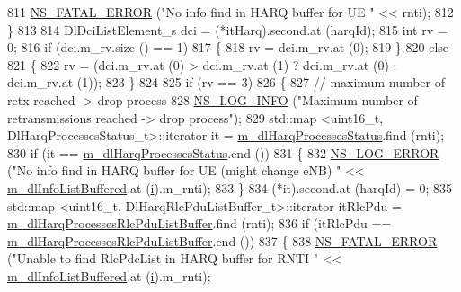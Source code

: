 \begin{DoxyCode}
811               \hyperlink{group__fatal_ga5131d5e3f75d7d4cbfd706ac456fdc85}{NS\_FATAL\_ERROR} (\textcolor{stringliteral}{"No info find in HARQ buffer for UE "} << rnti);
812             \}
813 
814           DlDciListElement\_s dci = (*itHarq).second.at (harqId);
815           \textcolor{keywordtype}{int} rv = 0;
816           \textcolor{keywordflow}{if} (dci.m\_rv.size () == 1)
817             \{
818               rv = dci.m\_rv.at (0);
819             \}
820           \textcolor{keywordflow}{else}
821             \{
822               rv = (dci.m\_rv.at (0) > dci.m\_rv.at (1) ? dci.m\_rv.at (0) : dci.m\_rv.at (1));
823             \}
824 
825           \textcolor{keywordflow}{if} (rv == 3)
826             \{
827               \textcolor{comment}{// maximum number of retx reached -> drop process}
828               \hyperlink{group__logging_gafbd73ee2cf9f26b319f49086d8e860fb}{NS\_LOG\_INFO} (\textcolor{stringliteral}{"Maximum number of retransmissions reached -> drop process"});
829               std::map <uint16\_t, DlHarqProcessesStatus\_t>::iterator it = 
      \hyperlink{classns3_1_1TdBetFfMacScheduler_af9f2ffd80c6d473a5ccee8fb153d40f6}{m\_dlHarqProcessesStatus}.find (rnti);
830               \textcolor{keywordflow}{if} (it == \hyperlink{classns3_1_1TdBetFfMacScheduler_af9f2ffd80c6d473a5ccee8fb153d40f6}{m\_dlHarqProcessesStatus}.end ())
831                 \{
832                   \hyperlink{group__logging_ga0261a8db1d4ac5f79417d117634fd455}{NS\_LOG\_ERROR} (\textcolor{stringliteral}{"No info find in HARQ buffer for UE (might change eNB) "} << 
      \hyperlink{classns3_1_1TdBetFfMacScheduler_ad28a9447cadd7f80c4fe5d3801d8828b}{m\_dlInfoListBuffered}.at (\hyperlink{bernuolliDistribution_8m_a6f6ccfcf58b31cb6412107d9d5281426}{i}).m\_rnti);
833                 \}
834               (*it).second.at (harqId) = 0;
835               std::map <uint16\_t, DlHarqRlcPduListBuffer\_t>::iterator itRlcPdu =  
      \hyperlink{classns3_1_1TdBetFfMacScheduler_a066bceddaca3ed4a25974ada3aba3028}{m\_dlHarqProcessesRlcPduListBuffer}.find (rnti);
836               \textcolor{keywordflow}{if} (itRlcPdu == \hyperlink{classns3_1_1TdBetFfMacScheduler_a066bceddaca3ed4a25974ada3aba3028}{m\_dlHarqProcessesRlcPduListBuffer}.end ())
837                 \{
838                   \hyperlink{group__fatal_ga5131d5e3f75d7d4cbfd706ac456fdc85}{NS\_FATAL\_ERROR} (\textcolor{stringliteral}{"Unable to find RlcPdcList in HARQ buffer for RNTI "} << 
      \hyperlink{classns3_1_1TdBetFfMacScheduler_ad28a9447cadd7f80c4fe5d3801d8828b}{m\_dlInfoListBuffered}.at (\hyperlink{bernuolliDistribution_8m_a6f6ccfcf58b31cb6412107d9d5281426}{i}).m\_rnti);

\end{DoxyCode}
